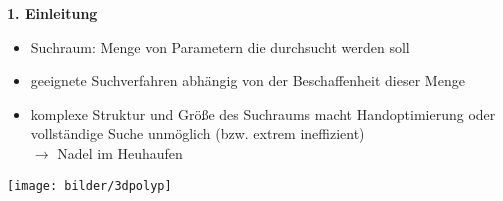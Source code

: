     \begin{frame}
    \textbf{1. Einleitung}
        
    \begin{itemize}
      \item Suchraum: Menge von Parametern die durchsucht werden soll
      \item geeignete Suchverfahren abhängig von der Beschaffenheit dieser Menge
      \item komplexe Struktur und Größe des Suchraums macht Handoptimierung oder vollständige Suche
      unmöglich (bzw. extrem ineffizient) \\ $\rightarrow$ Nadel im Heuhaufen
    \end{itemize}
      
  \hspace{0.33cm}    
  \texttt{[image: bilder/3dpolyp]}
  \hspace{0.33cm}    

    \end{frame}
    

    
      
